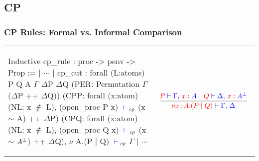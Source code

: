 \documentclass{beamer}
\let\oldframetitle\frametitle
\renewcommand{\frametitle}[1]{
  \oldframetitle{#1}\vspace{-3.5cm}
}
\begin{document}
\subsection{CP}

\begin{frame}[fragile]
\oldframetitle{CP Rules: Formal vs. Informal Comparison}
\begin{tabular}{lc}
\begin{coqp}
Inductive cp_rule : proc -> penv -> Prop :=
  | $\cdots$
  | cp_cut :
      forall (L:atoms) P Q A $\Gamma$ $\Delta$P $\Delta$Q
             (PER: Permutation $\Gamma$ ($\Delta$P ++ $\Delta$Q))
             (CPP: forall (x:atom) (NL: x $\notin$ L),
                     (open_proc P x) ${\color{blue} {} \vdash {}}_{cp}$ (x $\sim$ A) ++ $\Delta$P)
             (CPQ: forall (x:atom) (NL: x $\notin$ L),
                (open_proc Q x) ${\color{blue} {} \vdash {}}_{cp}$ (x $\sim$ $A^\bot$) ++ $\Delta$Q),
        $\nu$ A.(P $\mid$ Q) ${\color{blue} {} \vdash {}}_{cp}$ $\Gamma$
  | $\cdots$
\end{coqp} &
\begin{math}
\colored
\inference{
  \tm{P} \tpvdash \tp{\Gamma \comma \tmof{x}A}
  &
  \tm{Q} \tpvdash \tp{\Delta \comma \tmof{x}\dualbt{A}}
}{}{
  \tm{\nu x \of{A}.(P \mid Q)} \tpvdash \tp{\Gamma \comma \Delta}
}
\end{math}
\end{tabular}

\end{frame}

\begin{comment}
lets take a look at cp's typing rules. here we used a well typed relation on
the process terms of cp. we require additional assumptions for environment
ordering and more attention is paid to the opening of subprocesses. this
presents the informal and formal definitions of cut. There is no overhead when
introducing binders to the subprocesses or for environment ordering, but apart
from these representation issues the rules look similar which could assist the
uptake of such formal tools by programming language researchers.
\end{comment}
\end{document}
